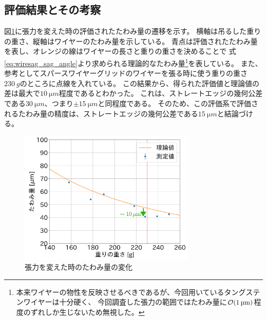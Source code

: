 \documentclass[../../main.tex]{subfiles}
\begin{document}
\subsection{評価結果とその考察}
図\ref{fig:wiresag_performance_check_result}に張力を変えた時の評価されたたわみ量の遷移を示す。
横軸は吊るした重りの重さ、縦軸はワイヤーのたわみ量を示している。
青点は評価されたたわみ量を表し、オレンジの線はワイヤーの長さと重りの重さを決めることで
式\eqref{eq:wiresag_sag_angle}より求められる理論的なたわみ量\footnote{本来ワイヤーの物性を反映させるべきであるが、今回用いているタングステンワイヤーは十分硬く、
今回調査した張力の範囲ではたわみ量に$\order{\SI{1}{\micro m}}$程度のずれしか生じないため無視した。}を表している。
また、参考としてスパースワイヤーグリッドのワイヤーを張る時に使う重りの重さ$\SI{230}{g}$のところに点線を入れている。
この結果から、得られた評価値と理論値の差は最大で$\SI{10}{\micro m}$程度であるとわかった。
これは、ストレートエッジの幾何公差である$\SI{30}{\micro m}$、つまり$\pm \SI{15}{\micro m}$と同程度である。
そのため、この評価系で評価されるたわみ量の精度は、ストレートエッジの幾何公差である$\SI{15}{\micro m}$と結論づける。
\begin{figure}[H]
    \centering
    \includegraphics[width=0.75\textwidth]{wiresag/wiresag_performance_check_result.pdf}
    \caption{張力を変えた時のたわみ量の変化}
    \label{fig:wiresag_performance_check_result}
\end{figure}
\end{document}
